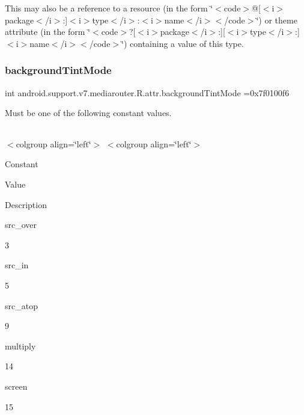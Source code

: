 This may also be a reference to a resource (in the form \char`\"{}$<$code$>$@\mbox{[}$<$i$>$package$<$/i$>$\+:\mbox{]}$<$i$>$type$<$/i$>$\+:$<$i$>$name$<$/i$>$$<$/code$>$\char`\"{}) or theme attribute (in the form \char`\"{}$<$code$>$?\mbox{[}$<$i$>$package$<$/i$>$\+:\mbox{]}\mbox{[}$<$i$>$type$<$/i$>$\+:\mbox{]}$<$i$>$name$<$/i$>$$<$/code$>$\char`\"{}) containing a value of this type. \mbox{\label{classandroid_1_1support_1_1v7_1_1mediarouter_1_1R_1_1attr_aefc80f6abace3364d34c2ae3f36b7b66}} 
\subsubsection{\texorpdfstring{background\+Tint\+Mode}{backgroundTintMode}}
{\footnotesize\ttfamily int android.\+support.\+v7.\+mediarouter.\+R.\+attr.\+background\+Tint\+Mode =0x7f0100f6\hspace{0.3cm}{\ttfamily [static]}}

Must be one of the following constant values.

\tabulinesep=1mm
\begin{longtabu} spread 0pt [c]{*{0}{|X[-1]}|}
\hline
\end{longtabu}
$<$colgroup align=\char`\"{}left\char`\"{}$>$ $<$colgroup align=\char`\"{}left\char`\"{}$>$ 

Constant

Value

Description 

{\ttfamily src\+\_\+over}

3

{\ttfamily src\+\_\+in}

5

{\ttfamily src\+\_\+atop}

9

{\ttfamily multiply}

14

{\ttfamily screen}

15\mbox{\label{classandroid_1_1support_1_1v7_1_1mediarouter_1_1R_1_1attr_af3333d2b51e7532bedd93dd5471fdbc4}} 
